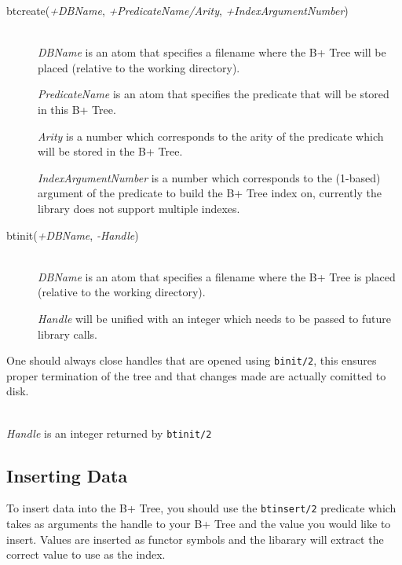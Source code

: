 \begin{description}

\item[btcreate({\it +DBName}, {\it +PredicateName/Arity}, {\it +IndexArgumentNumber})]\mbox{}
  \\
    {\it DBName} is an atom that specifies a filename where the B+ Tree will be placed (relative to the working directory).

    {\it PredicateName} is an atom that specifies the predicate that will be stored in this B+ Tree.
    
    {\it Arity} is a number which corresponds to the arity of the predicate which will be stored in the B+ Tree.
    
    {\it IndexArgumentNumber} is a number which corresponds to the (1-based) argument of the predicate to build the 
    B+ Tree index on, currently the library does not support multiple indexes. 
\item[btinit({\it +DBName}, {\it -Handle})]\mbox{}
  \\
    {\it DBName} is an atom that specifies a filename where the B+ Tree is placed (relative to the working directory).

    {\it Handle} will be unified with an integer which needs to be passed to future library calls.

\end{description}
One should always close handles that are opened using {\tt binit/2}, this ensures proper termination of the tree
and that changes made are actually comitted to disk.
\begin{description}

\item[btclose({\it +Handle})]\mbox{}
  \\
    {\it Handle} is an integer returned by {\tt btinit/2}

\end{description}

\subsection{Inserting Data}

To insert data into the B+ Tree, you should use the {\tt btinsert/2} predicate which takes as arguments the handle to
your B+ Tree and the value you would like to insert. Values are inserted as functor symbols and the libarary will extract
the correct value to use as the index.

